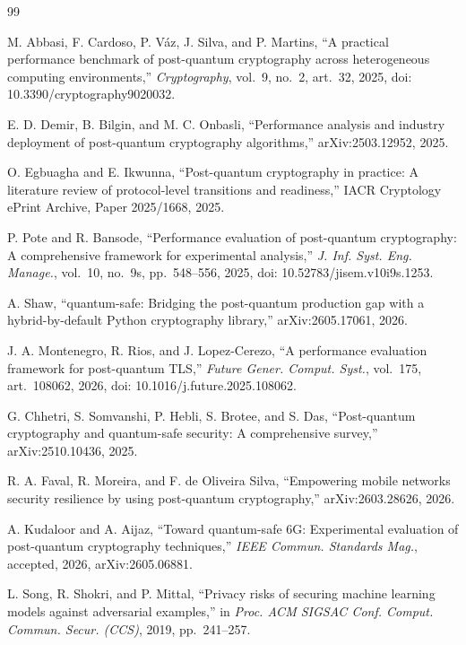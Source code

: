 \documentclass[conference]{IEEEtran}
\begin{document}
\begin{thebibliography}{99}

 M. Abbasi, F. Cardoso, P. V\'az, J. Silva, and P. Martins, ``A practical
performance benchmark of post-quantum cryptography across heterogeneous computing environments,''
\textit{Cryptography}, vol.~9, no.~2, art.~32, 2025, doi: 10.3390/cryptography9020032.

 E. D. Demir, B. Bilgin, and M. C. Onbasli, ``Performance analysis and
industry deployment of post-quantum cryptography algorithms,'' arXiv:2503.12952, 2025.

 O. Egbuagha and E. Ikwunna, ``Post-quantum cryptography in practice: A
literature review of protocol-level transitions and readiness,'' IACR Cryptology ePrint Archive, Paper
2025/1668, 2025.

 P. Pote and R. Bansode, ``Performance evaluation of post-quantum
cryptography: A comprehensive framework for experimental analysis,'' \textit{J. Inf. Syst. Eng.
Manage.}, vol.~10, no.~9s, pp.~548--556, 2025, doi: 10.52783/jisem.v10i9s.1253.

 A. Shaw, ``quantum-safe: Bridging the post-quantum production gap with a
hybrid-by-default Python cryptography library,'' arXiv:2605.17061, 2026.

 J. A. Montenegro, R. Rios, and J. Lopez-Cerezo, ``A performance
evaluation framework for post-quantum TLS,'' \textit{Future Gener. Comput. Syst.}, vol.~175,
art.~108062, 2026, doi: 10.1016/j.future.2025.108062.

 G. Chhetri, S. Somvanshi, P. Hebli, S. Brotee, and S. Das, ``Post-quantum
cryptography and quantum-safe security: A comprehensive survey,'' arXiv:2510.10436, 2025.

 R. A. Faval, R. Moreira, and F. de Oliveira Silva, ``Empowering mobile
networks security resilience by using post-quantum cryptography,'' arXiv:2603.28626, 2026.

 A. Kudaloor and A. Aijaz, ``Toward quantum-safe 6G: Experimental evaluation
of post-quantum cryptography techniques,'' \textit{IEEE Commun. Standards Mag.}, accepted, 2026,
arXiv:2605.06881.

 L. Song, R. Shokri, and P. Mittal, ``Privacy risks of securing machine
learning models against adversarial examples,'' in \textit{Proc. ACM SIGSAC Conf. Comput. Commun.
Secur. (CCS)}, 2019, pp.~241--257.


\end{thebibliography}
\end{document}
